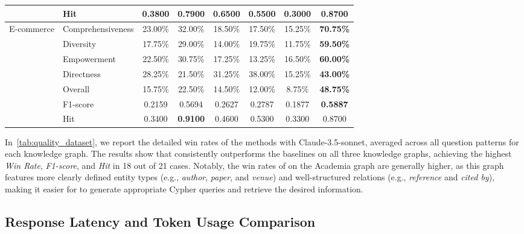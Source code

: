 \begin{table}[!t]
{\begin{tabular}{@{}clcccccc@{}}
 & Hit & 0.3800 & 0.7900 & 0.6500 & 0.5500 & 0.3000 & \textbf{0.8700} \\ \midrule
\multirow{8}{*}{E-commerce} & Comprehensiveness & 23.00\% & 32.00\% & 18.50\% & 17.50\% & 15.25\% & \textbf{70.75\%} \\
 & Diversity & 17.75\% & 29.00\% & 14.00\% & 19.75\% & 11.75\% & \textbf{59.50\%} \\
 & Empowerment & 22.50\% & 30.75\% & 17.25\% & 13.25\% & 16.50\% & \textbf{60.00\%} \\
 & Directness & 28.25\% & 21.50\% & 31.25\% & 38.00\% & 15.25\% & \textbf{43.00\%} \\
 & Overall & 15.75\% & 22.50\% & 14.50\% & 12.00\% & 8.75\% & \textbf{48.75\%} \\ \cmidrule(l){2-8} 
 & F1-score & 0.2159 & 0.5694 & 0.2627 & 0.2787 & 0.1877 & \textbf{0.5887} \\
 & Hit & 0.3400 & \textbf{0.9100} & 0.4600 & 0.5300 & 0.3300 & 0.8700 \\ \bottomrule
\end{tabular}%
}
\end{table}

 In~\autoref{tab:quality_dataset}, we report the detailed win rates of the methods with Claude-3.5-sonnet, averaged across all question patterns for each knowledge graph. The results show that \name{} consistently outperforms the baselines on all three knowledge graphs, achieving the highest \textit{Win Rate}, \textit{F1-score}, and \textit{Hit} in 18 out of 21 cases. Notably, the win rates of \name{} on the Academia graph are generally higher, as this graph features more clearly defined entity types (e.g., \textit{author}, \textit{paper}, and \textit{venue}) and well-structured relations (e.g., \textit{reference} and \textit{cited by}), making it easier for \name{} to generate appropriate Cypher queries and retrieve the desired information.


\subsection{Response Latency and Token Usage Comparison}


